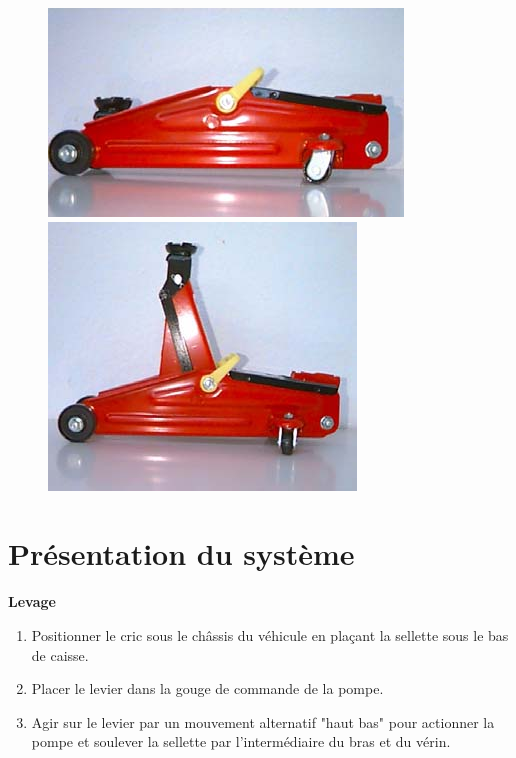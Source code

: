 \begin{figure}[htbp]
 \begin{minipage}[c]{.45\linewidth}
  \centering\includegraphics[width=0.8\linewidth]{img/cric-004.png}
 \end{minipage}
 \hfill
 \begin{minipage}[c]{.45\linewidth}
  \centering\includegraphics[width=0.8\linewidth]{img/cric-005.png}
 \end{minipage}
\end{figure}

\section{Présentation du système}

\textbf{Levage}

\begin{enumerate}
 \item Positionner le cric sous le châssis du véhicule en plaçant la sellette sous le bas de caisse. 
 \item Placer le levier dans la gouge de commande de la pompe. 
 \item Agir sur le levier par un mouvement alternatif "haut bas" pour actionner la pompe et soulever la sellette par l'intermédiaire du bras et du vérin. 
\end{enumerate}

